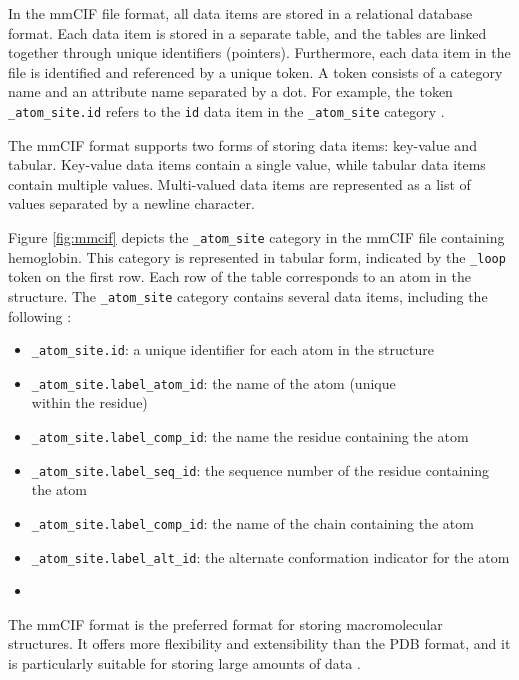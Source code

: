 \documentclass[
  digital,     %
  oneside,     %
  nosansbold,  %
  nocolorbold, %
  lof,         %
  lot,         %
]{fithesis4}
\begin{document}
In the mmCIF file format, all data items are stored in a relational database format. Each data item is stored in a separate table, and the tables are linked together through unique identifiers (pointers). Furthermore, each data item in the file is identified and referenced by a unique token. A token consists of a category name and an attribute name separated by a dot. For example, the token \texttt{\_atom\_site.id} refers to the \texttt{id} data item in the \texttt{\_atom\_site} category \cite{pdb101}.

The mmCIF format supports two forms of storing data items: key-value and tabular. Key-value data items contain a single value, while tabular data items contain multiple values. Multi-valued data items are represented as a list of values separated by a newline character. \cite{pdb101}

Figure \ref{fig:mmcif} depicts the \texttt{\_atom\_site} category in the mmCIF file containing hemoglobin. This category is represented in tabular form, indicated by the \texttt{\_loop} token on the first row. Each row of the table corresponds to an atom in the structure. The \texttt{\_atom\_site} category contains several data items, including the following \cite{mmcif_dictionary}:

\begin{itemize}
  \item \texttt{\_atom\_site.id}: a unique identifier for each atom in the structure
  \item \texttt{\_atom\_site.label\_atom\_id}: the name of the atom (unique \\
  within the residue)
  \item \texttt{\_atom\_site.label\_comp\_id}: the name the residue containing the atom
  \item \texttt{\_atom\_site.label\_seq\_id}: the sequence number of the residue containing the atom
  \item \texttt{\_atom\_site.label\_comp\_id}: the name of the chain containing the atom
  \item \texttt{\_atom\_site.label\_alt\_id}: the alternate conformation indicator for the atom
  \item 
\end{itemize}

The mmCIF format is the preferred format for storing macromolecular structures. It offers more flexibility and extensibility than the PDB format, and it is particularly suitable for storing large amounts of data \cite{}.
\end{document}
